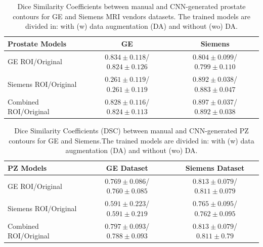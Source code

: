 \newpage
\begin{table}[h]
    \caption{Dice Similarity Coefficients between manual and CNN-generated prostate contours for GE and Siemens MRI vendors datasets. The trained models are divided in: with (w) data augmentation (DA) and without (wo) DA.}
    \label{tab:res_prost}
    \begin{tabular}{lcc}
         \hline
          \textbf{Prostate Models} & \textbf{GE} & \textbf{Siemens }\\
         \hline
         GE ROI/Original & $0.834\pm0.118$/$0.824\pm0.126$ & $0.804\pm0.099$/$0.799\pm0.110$ \\
         \hline
         Siemens ROI/Original & $0.261\pm0.119$/$0.261\pm0.119$ & $0.892\pm0.038$/$0.883\pm0.047$ \\
         \hline
         Combined ROI/Original & $0.828\pm0.116$/$\mathbf{0.824\pm0.113}$ & $\mathbf{0.897\pm0.037}$/$0.892\pm0.038$\\
         \hline
    \end{tabular}
\end{table}

\begin{table}[h]
    \caption{Dice Similarity Coefficients (DSC) between manual and CNN-generated PZ contours for GE and Siemens.The trained models are divided in: with (w) data augmentation (DA) and without (wo) DA.}
    \label{tab:res_pz}
    \begin{tabular}{lcc}
         \hline
          \textbf{PZ Models} & \textbf{GE Dataset} & \textbf{Siemens Dataset}\\
         \hline
         GE ROI/Original & $0.769\pm0.086$/$0.760\pm0.085$ & $0.813\pm0.079$/$0.811\pm0.079$ \\
         \hline
         Siemens ROI/Original & $0.591\pm0.223$/$0.591\pm0.219$ & $0.765\pm0.095$/$0.762\pm0.095$ \\
         \hline
         Combined ROI/Original & $\mathbf{0.797\pm0.093}$/$0.788\pm0.093$ & $\mathbf{0.813\pm0.079}$/$0.811\pm0.79$\\
         \hline
    \end{tabular}
\end{table}


